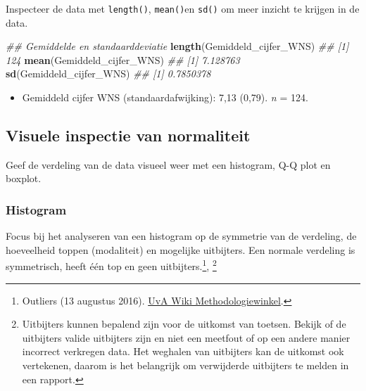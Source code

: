 \documentclass[
]{article}
\newenvironment{Shaded}{\begin{snugshade}}{\end{snugshade}}
\newcommand{\CommentTok}[1]{\textcolor[rgb]{0.56,0.35,0.01}{\textit{#1}}}
\newcommand{\KeywordTok}[1]{\textcolor[rgb]{0.13,0.29,0.53}{\textbf{#1}}}
\newcommand{\NormalTok}[1]{#1}
\providecommand{\tightlist}{%
  \setlength{\itemsep}{0pt}\setlength{\parskip}{0pt}}
\begin{document}
Inspecteer de data met \texttt{length()}, \texttt{mean()}en
\texttt{sd()} om meer inzicht te krijgen in de data.

\begin{Shaded}
\begin{Highlighting}[]
\CommentTok{## Gemiddelde en standaarddeviatie}
\KeywordTok{length}\NormalTok{(Gemiddeld_cijfer_WNS)}
\CommentTok{## [1] 124}
\KeywordTok{mean}\NormalTok{(Gemiddeld_cijfer_WNS)}
\CommentTok{## [1] 7.128763}
\KeywordTok{sd}\NormalTok{(Gemiddeld_cijfer_WNS)}
\CommentTok{## [1] 0.7850378}
\end{Highlighting}
\end{Shaded}

\begin{itemize}
\tightlist
\item
  Gemiddeld cijfer WNS (standaardafwijking): 7,13 (0,79). \emph{n} =
  124. 
\end{itemize}

\hypertarget{visuele-inspectie-van-normaliteit}{%
\subsection{Visuele inspectie van
normaliteit}\label{visuele-inspectie-van-normaliteit}}

Geef de verdeling van de data visueel weer met een histogram, Q-Q plot
en boxplot.

\hypertarget{histogram}{%
\subsubsection{Histogram}\label{histogram}}

Focus bij het analyseren van een histogram op de symmetrie van de
verdeling, de hoeveelheid toppen (modaliteit) en mogelijke uitbijters.
Een normale verdeling is symmetrisch, heeft één top en geen
uitbijters.\footnote{Outliers (13 augustus 2016).
  \href{https://wiki.uva.nl/methodologiewinkel/index.php/Outliers}{UvA
  Wiki Methodologiewinkel}.}, \footnote{Uitbijters kunnen bepalend zijn
  voor de uitkomst van toetsen. Bekijk of de uitbijters valide
  uitbijters zijn en niet een meetfout of op een andere manier incorrect
  verkregen data. Het weghalen van uitbijters kan de uitkomst ook
  vertekenen, daarom is het belangrijk om verwijderde uitbijters te
  melden in een rapport.}
\end{document}

